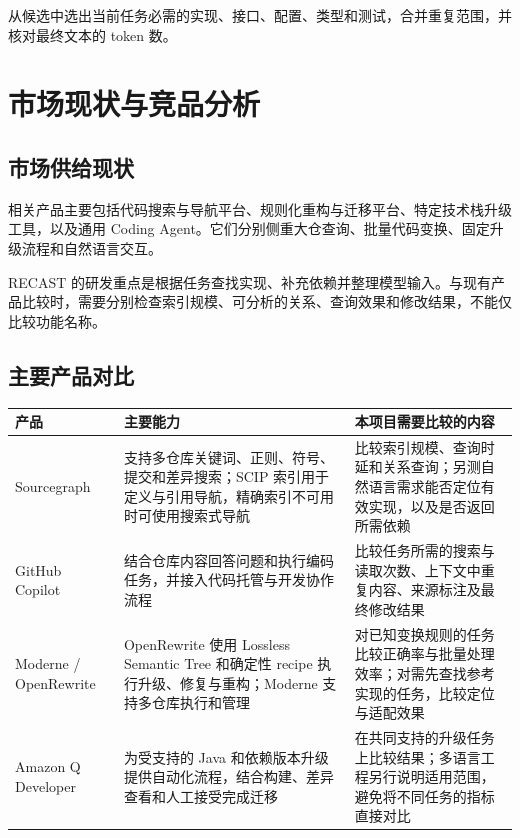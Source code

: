 从候选中选出当前任务必需的实现、接口、配置、类型和测试，合并重复范围，并核对最终文本的 token 数。

\chapter{市场现状与竞品分析}
\label{chap:market}

\section{市场供给现状}

相关产品主要包括代码搜索与导航平台、规则化重构与迁移平台、特定技术栈升级工具，以及通用 Coding Agent。它们分别侧重大仓查询、批量代码变换、固定升级流程和自然语言交互。

RECAST 的研发重点是根据任务查找实现、补充依赖并整理模型输入。与现有产品比较时，需要分别检查索引规模、可分析的关系、查询效果和修改结果，不能仅比较功能名称。

\section{主要产品对比}

\begin{center}\small
\begin{longtable}{P{0.19\textwidth}P{0.33\textwidth}P{0.38\textwidth}}
\toprule
产品 & 主要能力 & 本项目需要比较的内容 \\
\midrule\endhead
Sourcegraph & 支持多仓库关键词、正则、符号、提交和差异搜索；SCIP 索引用于定义与引用导航，精确索引不可用时可使用搜索式导航 & 比较索引规模、查询时延和关系查询；另测自然语言需求能否定位有效实现，以及是否返回所需依赖 \\
GitHub Copilot & 结合仓库内容回答问题和执行编码任务，并接入代码托管与开发协作流程 & 比较任务所需的搜索与读取次数、上下文中重复内容、来源标注及最终修改结果 \\
Moderne / OpenRewrite & OpenRewrite 使用 Lossless Semantic Tree 和确定性 recipe 执行升级、修复与重构；Moderne 支持多仓库执行和管理 & 对已知变换规则的任务比较正确率与批量处理效率；对需先查找参考实现的任务，比较定位与适配效果 \\
Amazon Q Developer & 为受支持的 Java 和依赖版本升级提供自动化流程，结合构建、差异查看和人工接受完成迁移 & 在共同支持的升级任务上比较结果；多语言工程另行说明适用范围，避免将不同任务的指标直接对比 \\
\bottomrule
\end{longtable}\end{center}

